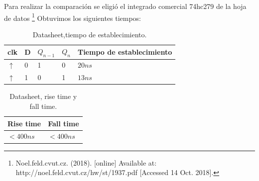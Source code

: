 \documentclass[../../e3_tp2_main.tex]{subfiles}
\begin{document}
Para realizar la comparación se eligió el integrado comercial 74hc279 de la hoja de datos
\footnote{Noel.feld.cvut.cz. (2018). [online] Available at: http://noel.feld.cvut.cz/hw/st/1937.pdf [Accessed 14 Oct. 2018].}
 Obtuvimos los siguientes tiempos:

\begin{table}[H]
\begin{center}
\begin{tabular}{|l|l|l|l|l|}
\hline
clk& D & $Q_{n-1}$ & $Q_n$ &Tiempo de establecimiento\\
\hline \hline
$\uparrow$ &0& 1&0&$20n s$  \\ \hline
$\uparrow$ &1&0&1&$13 n s$  \\ \hline
\end{tabular}
\caption{Datasheet,tiempo de establecimiento.} 
\end{center}
\end{table}

\begin{table}[H]
\begin{center}
\begin{tabular}{|l|l|}
\hline
Rise time& Fall time \\
\hline \hline
$<400 n s$  & $<400 n s$ \\ \hline
\end{tabular}
\caption{Datasheet, rise time y fall time.} 
\end{center}
\end{table}
\end{document}
